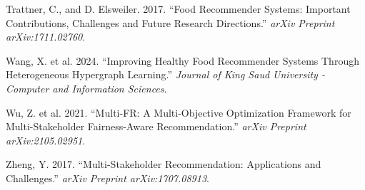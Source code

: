 \documentclass[
  letterpaper,
  DIV=11,
  numbers=noendperiod]{scrartcl}
\newlength{\cslhangindent}
\newenvironment{CSLReferences}[2] %
 {\begin{list}{}{%
  \setlength{\itemindent}{0pt}
  \setlength{\leftmargin}{0pt}
  \setlength{\parsep}{0pt}
  \ifodd #1
   \setlength{\leftmargin}{\cslhangindent}
   \setlength{\itemindent}{-1\cslhangindent}
  \fi
  \setlength{\itemsep}{#2\baselineskip}}}
 {\end{list}}
\begin{document}
\begin{CSLReferences}{1}{1}
Trattner, C., and D. Elsweiler. 2017. {``Food Recommender Systems:
Important Contributions, Challenges and Future Research Directions.''}
\emph{arXiv Preprint arXiv:1711.02760}.

{Wang, X. et al.} 2024. {``Improving Healthy Food Recommender Systems
Through Heterogeneous Hypergraph Learning.''} \emph{Journal of King Saud
University - Computer and Information Sciences}.

{Wu, Z. et al.} 2021. {``Multi-FR: A Multi-Objective Optimization
Framework for Multi-Stakeholder Fairness-Aware Recommendation.''}
\emph{arXiv Preprint arXiv:2105.02951}.

Zheng, Y. 2017. {``Multi-Stakeholder Recommendation: Applications and
Challenges.''} \emph{arXiv Preprint arXiv:1707.08913}.

\end{CSLReferences}
\end{document}
